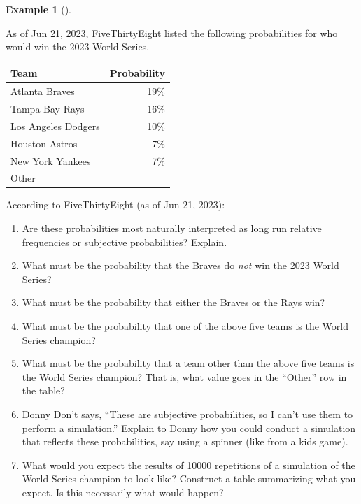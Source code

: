 \documentclass[
  letterpaper,
  DIV=11,
  numbers=noendperiod]{scrreprt}
\providecommand{\tightlist}{%
  \setlength{\itemsep}{0pt}\setlength{\parskip}{0pt}}
\theoremstyle{plain}
\theoremstyle{definition}
\newtheorem{example}{Example}[chapter]
\theoremstyle{definition}
\theoremstyle{definition}
\theoremstyle{remark}
\begin{document}
\begin{tcolorbox}[enhanced jigsaw, opacityback=0, left=2mm, colframe=quarto-callout-note-color-frame, toprule=.15mm, breakable, colback=white, leftrule=.75mm, arc=.35mm, rightrule=.15mm, bottomrule=.15mm]

\begin{example}[]\protect\hypertarget{exm-worldseries}{}\label{exm-worldseries}

As of Jun 21, 2023,
\href{https://projects.fivethirtyeight.com/2023-mlb-predictions/}{FiveThirtyEight}
listed the following probabilities for who would win the 2023 World
Series.

\begin{longtable}[]{@{}lr@{}}
\toprule\noalign{}
Team & Probability \\
\midrule\noalign{}
\endhead
\bottomrule\noalign{}
\endlastfoot
Atlanta Braves & 19\% \\
Tampa Bay Rays & 16\% \\
Los Angeles Dodgers & 10\% \\
Houston Astros & 7\% \\
New York Yankees & 7\% \\
Other & \\
\end{longtable}

According to FiveThirtyEight (as of Jun 21, 2023):

\begin{enumerate}
\def\labelenumi{\arabic{enumi}.}
\tightlist
\item
  Are these probabilities most naturally interpreted as long run
  relative frequencies or subjective probabilities? Explain.
\item
  What must be the probability that the Braves do \emph{not} win the
  2023 World Series?
\item
  What must be the probability that either the Braves or the Rays win?
\item
  What must be the probability that one of the above five teams is the
  World Series champion?
\item
  What must be the probability that a team other than the above five
  teams is the World Series champion? That is, what value goes in the
  ``Other'' row in the table?
\item
  Donny Don't says, ``These are subjective probabilities, so I can't use
  them to perform a simulation.'' Explain to Donny how you could conduct
  a simulation that reflects these probabilities, say using a spinner
  (like from a kids game).
\item
  What would you expect the results of 10000 repetitions of a simulation
  of the World Series champion to look like? Construct a table
  summarizing what you expect. Is this necessarily what would happen?
\end{enumerate}

\end{example}

\end{tcolorbox}
\end{document}
